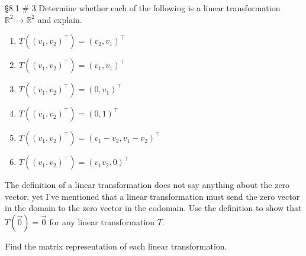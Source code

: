 \documentclass[]{exam}
\begin{document}
\begin{questions}
	\begin{solution}
	
	\end{solution}
	
	\question \S 8.1 \# 3 Determine whether each of the following is a linear transformation $\mathbb{R}^2 \to \mathbb{R}^2$ and explain.
	
	\begin{multicols}{2}
	\begin{enumerate}[label=(\alph*)]
	\item $T((v_1,v_2)^\intercal) = (v_2,v_1)^\intercal$
	\item $T((v_1,v_2)^\intercal) = (v_1,v_1)^\intercal$
	\item $T((v_1,v_2)^\intercal) = (0,v_1)^\intercal$
	\item $T((v_1,v_2)^\intercal) = (0,1)^\intercal$
	\item $T((v_1,v_2)^\intercal) = (v_1-v_2,v_1-v_2)^\intercal$
	\item $T((v_1,v_2)^\intercal) = (v_1v_2,0)^\intercal$
	\end{enumerate}
	\end{multicols}
	
	\begin{solution}
	
	\end{solution}
	
	\question The definition of a linear transformation does not say anything about the zero vector, yet I've mentioned that a linear transformation must send the zero vector in the domain to the zero vector in the codomain. Use the definition to show that $T(\vec{0}) = \vec{0}$ for any linear transformation $T$.
	
	\begin{solution}
	
	\end{solution}
	
	\question Find the matrix representation of each linear transformation.
	
	\begin{enumerate}[label=(\alph*)]
	
	
	\end{enumerate}
	

\end{questions}
\end{document}
